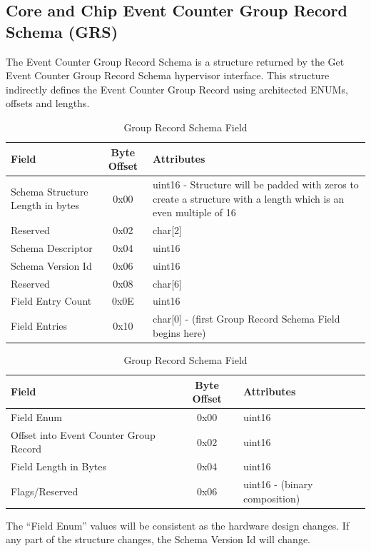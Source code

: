 \documentclass[14]{article}
\begin{document}
\subsection{Core and Chip Event Counter Group Record Schema
(GRS)}
The Event Counter Group Record Schema is a structure returned by the Get Event
Counter Group Record Schema hypervisor interface. This structure indirectly
defines the Event Counter Group Record using architected ENUMs, offsets and
lengths.

\begin{table}[hd]
  \begin{tabular}[l]{|p{5cm}|c|p{7cm}|}
    \hline
    \textbf{Field} & \textbf{Byte Offset} & \textbf{Attributes} \\
    \hline
    Schema Structure Length in bytes & 0x00 & uint16 - Structure will be padded
                                              with zeros to create a structure
                                              with a length which is an even
                                              multiple of 16 \\ \hline
    Reserved & 0x02 & char[2] \\ \hline
    Schema Descriptor & 0x04 & uint16 \\ \hline
    Schema Version Id & 0x06 & uint16 \\ \hline
    Reserved & 0x08 & char[6] \\ \hline
    Field Entry Count & 0x0E & uint16 \\ \hline
    Field Entries & 0x10 & char[0] - (first Group Record Schema Field begins here)
    \\ \hline
  \end{tabular}
  \caption{Group Record Schema}

  \begin{tabular}[l]{|p{5cm}|c|p{7cm}|}
    \hline
    \textbf{Field} & \textbf{Byte Offset} & \textbf{Attributes} \\
    \hline
    Field Enum & 0x00 & uint16 \\ \hline
    Offset into Event Counter Group Record & 0x02 & uint16 \\ \hline
    Field Length in Bytes & 0x04 & uint16 \\ \hline
    Flags/Reserved & 0x06 & uint16 - (binary composition) \\ \hline
  \end{tabular}
  \caption{Group Record Schema Field}
\end{table}

The ``Field Enum'' values will be consistent as the hardware design changes. If
any part of the structure changes, the Schema Version Id will change.
\end{document}
